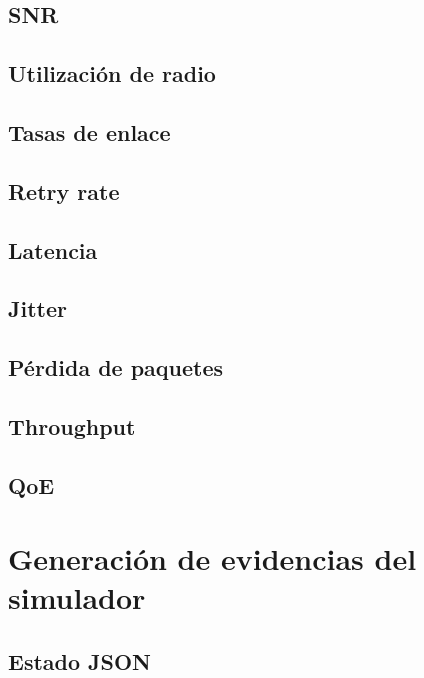 \subsection{SNR}
\label{subsec:snr}

\subsection{Utilización de radio}
\label{subsec:utilizacion-radio}

\subsection{Tasas de enlace}
\label{subsec:tasas-enlace}

\subsection{Retry rate}
\label{subsec:retry-rate}

\subsection{Latencia}
\label{subsec:latencia}

\subsection{Jitter}
\label{subsec:jitter}

\subsection{Pérdida de paquetes}
\label{subsec:perdida-paquetes}

\subsection{Throughput}
\label{subsec:throughput}

\subsection{QoE}
\label{subsec:qoe}


\section{Generación de evidencias del simulador}
\label{sec:generacion-evidencias-simulador}

\subsection{Estado JSON}
\label{subsec:estado-json}

